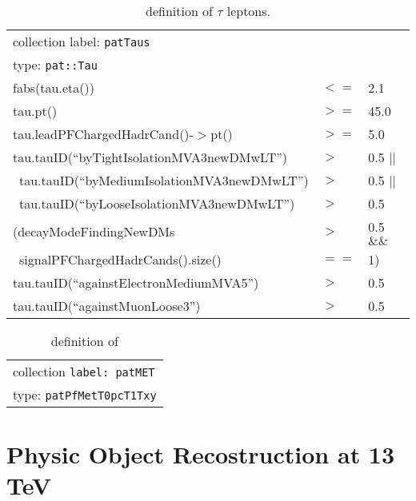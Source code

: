 \begin{table}[htb]
  \caption{definition of $\tau$ leptons.}
  \label{table:tauobjdefinition}
  \begin{center}
  \ttfamily\scriptsize\selectfont
  \begin{tabular}{|l|ll|}
    \hline
    \multicolumn{3}{|l|}{ collection label: \texttt{patTaus}}\\
    \multicolumn{3}{|l|}{ type: \texttt{pat::Tau}}\\
    \hline
    fabs(tau.eta()) & $<=$ & 2.1 \\
    tau.pt() & $>=$ & 45.0 \\
    tau.leadPFChargedHadrCand()-$>$pt() & $>=$ & 5.0 \\
    tau.tauID(``byTightIsolationMVA3newDMwLT'') & $>$ & 0.5 ||\\
    ~tau.tauID(``byMediumIsolationMVA3newDMwLT'') & $>$ & 0.5 ||\\
    ~tau.tauID(``byLooseIsolationMVA3newDMwLT'') & $>$ & 0.5 \\
    (decayModeFindingNewDMs & $>$ & 0.5 $\&\&$ \\ 
    ~signalPFChargedHadrCands().size() & $==$ & 1) \\
    tau.tauID(``againstElectronMediumMVA5'') & $>$ & 0.5 \\
    tau.tauID(``againstMuonLoose3'') & $>$ & 0.5 \\
    \hline
  \end{tabular}
  \end{center}
\end{table}

\begin{table}[htb]
  \caption{definition of \met}
  \label{table:metobjdefinition}
  \ttfamily\scriptsize\selectfont
  \begin{center}
   \begin{tabular}{|l|ll|}
      \hline
      \multicolumn{3}{|l|}{ collection \texttt{label: patMET}}\\
      \multicolumn{3}{|l|}{ type: \texttt{patPfMetT0pcT1Txy}}\\
      \hline
    \end{tabular}
  \end{center}
\end{table}

\section{Physic Object Recostruction at 13 TeV}
